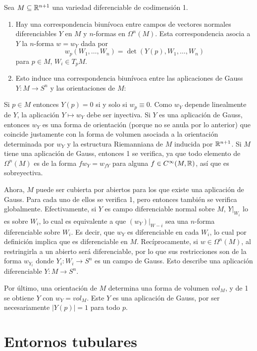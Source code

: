 \documentclass[CV.tex]{subfiles}
\begin{document}
\begin{prop}
Sea $M\subseteq\mathbb{R}^{n+1}$ una variedad diferenciable de codimensión 1.
\begin{enumerate}
\item Hay una correspondencia biunívoca entre campos de vectores normales diferenciables $Y$ en $M$ y $n$-formas en $\Omega^n(M)$. Esta correspondencia asocia a $Y$ la $n$-forma $w=w_Y$ dada por
\[
w_p(W_1,\dots, W_n)=\det(Y(p), W_1,\dots, W_n)
\]
para $p\in M$, $W_i\in T_pM$.
\item Esto induce una correspondencia biunívoca entre las aplicaciones de Gauss $Y:M\to S^n$ y las orientaciones de $M$:
\end{enumerate}
\end{prop}
\begin{dem}
Si $p\in M$ entonces $Y(p)=0$ si y solo si $w_p\equiv 0$. Como $w_Y$ depende linealmente de $Y$, la aplicación $Y\mapsto w_Y$ debe ser inyectiva. Si $Y$ es una aplicación de Gauss, entonces $w_Y$ es una forma de orientación (porque no se anula por lo anterior) que coincide justamente con la forma de volumen asociada a la orientación determinada por $w_Y$ y la estructura Riemanniana de $M$ inducida por $\mathbb{R}^{n+1}$. Si $M$ tiene una aplicación de Gauss, entonces 1 se verifica, ya que todo elemento de $\Omega^n(M)$ es de la forma $fw_Y=w_{fY}$ para alguna $f\in C^{\infty}(M,\mathbb{R})$, así que es sobreyectiva. 

Ahora, $M$ puede ser cubierta por abiertos para los que existe una aplicación de Gauss. Para cada uno de ellos se verifica 1, pero entonces también se verifica globalmente. Efectivamente, si $Y$ es campo diferenciable normal sobre $M$, $Y|_{W_i}$ lo es sobre $W_i$, lo cual es equivalente a que $(w_Y)|_{W-i}$ sea una $n$-forma diferenciable sobre $W_i$. Es decir, que $w_Y$ es diferenciable en cada $W_i$, lo cual por definición implica que es diferenciable en $M$. Recíprocamente, si $w\in\Omega^n(M)$, al restringirla a un abierto será diferenciable, por lo que sus restricciones son de la forma $w_{Y_i}$ donde $Y_i:W_i\to S^n$ es un campo de Gauss. Esto describe una aplicación diferenciable $Y:M\to S^n$. 

Por último, una orientación de $M$ determina una forma de volumen $vol_M$, y de 1 se obtiene $Y$ con $w_Y=vol_M$. Este $Y$ es una aplicación de Gauss, por ser necesariamente $|Y(p)|=1$ para todo $p$.  
\QED
\end{dem}

\section{Entornos tubulares}
\end{document}
